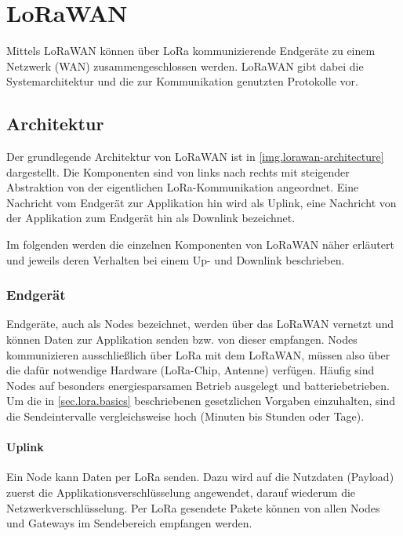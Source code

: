 \chapter{LoRaWAN}
Mittels LoRaWAN können über LoRa kommunizierende Endgeräte zu einem Netzwerk (WAN) zusammengeschlossen werden.
LoRaWAN gibt dabei die Systemarchitektur und die zur Kommunikation genutzten Protokolle vor.



\section{Architektur}
Der grundlegende Architektur von LoRaWAN ist in \autoref{img.lorawan-architecture} dargestellt.
Die Komponenten sind von links nach rechts mit steigender Abstraktion von der eigentlichen LoRa-Kommunikation angeordnet.
Eine Nachricht vom Endgerät zur Applikation hin wird als \gls{Uplink}, eine Nachricht von der Applikation zum Endgerät hin als \gls{Downlink} bezeichnet.
\cite{lorawanarchitecture}

Im folgenden werden die einzelnen Komponenten von LoRaWAN näher erläutert und jeweils deren Verhalten bei einem Up- und Downlink beschrieben.


\subsection{Endgerät}
Endgeräte, auch als \glspl{Node} bezeichnet, werden über das LoRaWAN vernetzt und können Daten zur Applikation senden bzw. von dieser empfangen.
Nodes kommunizieren ausschließlich über LoRa mit dem LoRaWAN, müssen also über die dafür notwendige Hardware (LoRa-Chip, Antenne) verfügen.
Häufig sind Nodes auf besonders energiesparsamen Betrieb ausgelegt und batteriebetrieben.
Um die in \autoref{sec.lora.basics} beschriebenen gesetzlichen Vorgaben einzuhalten, sind die Sendeintervalle vergleichsweise hoch (Minuten bis Stunden oder Tage).

\subsubsection{Uplink}
Ein Node kann Daten per LoRa senden.
Dazu wird auf die Nutzdaten (\gls{Payload}) zuerst die Applikationsverschlüsselung angewendet, darauf wiederum die Netzwerkverschlüsselung.
Per LoRa gesendete Pakete können von allen Nodes und Gateways im Sendebereich empfangen werden.

